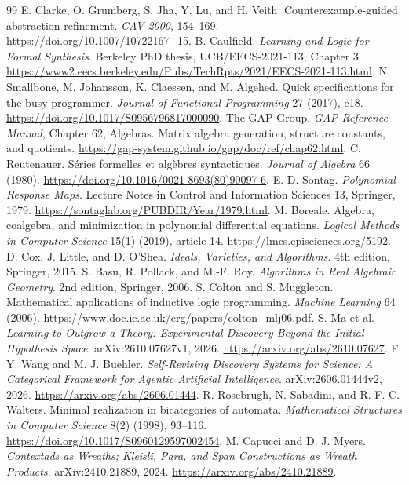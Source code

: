 \documentclass[11pt]{article}
\theoremstyle{definition}
\theoremstyle{remark}\newtheorem{remark}[theorem]{Remark}
\begin{document}
\begin{thebibliography}{99}
 E. Clarke, O. Grumberg, S. Jha, Y. Lu, and H. Veith.
Counterexample-guided abstraction refinement. \emph{CAV 2000}, 154--169.
\url{https://doi.org/10.1007/10722167_15}.
 B. Caulfield.
\emph{Learning and Logic for Formal Synthesis}.
Berkeley PhD thesis, UCB/EECS-2021-113, Chapter 3.
\url{https://www2.eecs.berkeley.edu/Pubs/TechRpts/2021/EECS-2021-113.html}.
 N. Smallbone, M. Johansson, K. Claessen, and M. Algehed.
Quick specifications for the busy programmer.
\emph{Journal of Functional Programming} 27 (2017), e18.
\url{https://doi.org/10.1017/S0956796817000090}.
 The GAP Group. \emph{GAP Reference Manual}, Chapter 62,
Algebras. Matrix algebra generation, structure constants, and quotients.
\url{https://gap-system.github.io/gap/doc/ref/chap62.html}.
 C. Reutenauer.
S\'eries formelles et alg\`ebres syntactiques.
\emph{Journal of Algebra} 66 (1980).
\url{https://doi.org/10.1016/0021-8693(80)90097-6}.
 E. D. Sontag. \emph{Polynomial Response Maps}.
Lecture Notes in Control and Information Sciences 13, Springer, 1979.
\url{https://sontaglab.org/PUBDIR/Year/1979.html}.
 M. Boreale.
Algebra, coalgebra, and minimization in polynomial differential equations.
\emph{Logical Methods in Computer Science} 15(1) (2019), article 14.
\url{https://lmcs.episciences.org/5192}.
 D. Cox, J. Little, and D. O'Shea.
\emph{Ideals, Varieties, and Algorithms}. 4th edition, Springer, 2015.
 S. Basu, R. Pollack, and M.-F. Roy.
\emph{Algorithms in Real Algebraic Geometry}. 2nd edition, Springer, 2006.
 S. Colton and S. Muggleton.
Mathematical applications of inductive logic programming.
\emph{Machine Learning} 64 (2006).
\url{https://www.doc.ic.ac.uk/crg/papers/colton_mlj06.pdf}.
 S. Ma et al.
\emph{Learning to Outgrow a Theory: Experimental Discovery Beyond the
Initial Hypothesis Space}. arXiv:2610.07627v1, 2026.
\url{https://arxiv.org/abs/2610.07627}.
 F. Y. Wang and M. J. Buehler.
\emph{Self-Revising Discovery Systems for Science: A Categorical Framework
for Agentic Artificial Intelligence}. arXiv:2606.01444v2, 2026.
\url{https://arxiv.org/abs/2606.01444}.
 R. Rosebrugh, N. Sabadini, and R. F. C. Walters.
Minimal realization in bicategories of automata.
\emph{Mathematical Structures in Computer Science} 8(2) (1998), 93--116.
\url{https://doi.org/10.1017/S0960129597002454}.
 M. Capucci and D. J. Myers.
\emph{Contextads as Wreaths; Kleisli, Para, and Span Constructions as
Wreath Products}. arXiv:2410.21889, 2024.
\url{https://arxiv.org/abs/2410.21889}.
\end{thebibliography}
\end{document}
